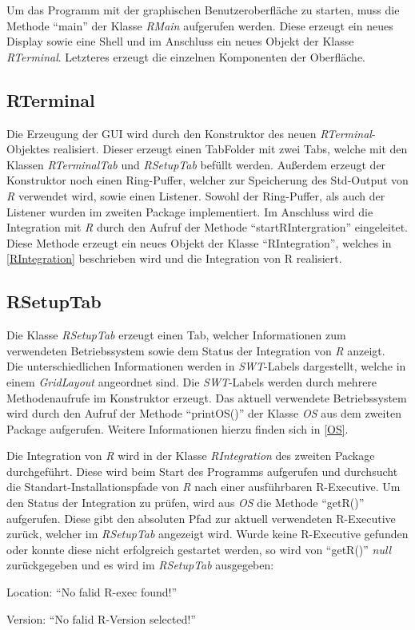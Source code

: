 \documentclass[a4paper, 12pt]{report} %
\begin{document}
Um das Programm mit der graphischen Benutzeroberfläche zu starten, muss die Methode "`main"' der Klasse \textit{RMain} aufgerufen werden. Diese erzeugt ein neues Display sowie eine Shell und im Anschluss ein neues Objekt der Klasse \textit{RTerminal}.
Letzteres erzeugt die einzelnen Komponenten der Oberfläche.

\subsection{RTerminal}

Die Erzeugung der GUI wird durch den Konstruktor des neuen \textit{RTerminal}-Objektes realisiert. Dieser erzeugt einen TabFolder mit zwei Tabs, welche mit den Klassen \textit{RTerminalTab} und \textit{RSetupTab} befüllt werden.
Außerdem erzeugt der Konstruktor noch einen Ring-Puffer, welcher zur Speicherung des Std-Output von \textit{R} verwendet wird, sowie einen Listener. Sowohl der Ring-Puffer, als auch der Listener wurden im zweiten Package implementiert.
Im Anschluss wird die Integration mit \textit{R} durch den Aufruf der Methode "`startRIntergration"' eingeleitet.\\

Diese Methode erzeugt ein neues Objekt der Klasse "`RIntegration"', welches in \ref{RIntegration} beschrieben wird und die Integration von R realisiert.

\subsection{RSetupTab}

Die Klasse \textit{RSetupTab} erzeugt einen Tab, welcher Informationen zum verwendeten Betriebssystem sowie dem Status der Integration von \textit{R} anzeigt.\\

Die unterschiedlichen Informationen werden in \textit{SWT}-Labels dargestellt, welche in einem \textit{GridLayout} angeordnet sind.
Die \textit{SWT}-Labels werden durch mehrere Methodenaufrufe im Konstruktor erzeugt.
Das aktuell verwendete Betriebssystem wird durch den Aufruf der Methode "`printOS()"' der Klasse \textit{OS} aus dem zweiten Package aufgerufen. Weitere Informationen hierzu finden sich in \ref{OS}.

Die Integration von \textit{R} wird in der Klasse \textit{RIntegration} des zweiten Package durchgeführt. Diese wird beim Start des Programms aufgerufen und durchsucht die Standart-Installationspfade von \textit{R} nach einer ausführbaren R-Executive.
 Um den Status der Integration zu prüfen, wird aus \textit{OS} die Methode "`getR()"' aufgerufen. Diese gibt den absoluten Pfad zur aktuell verwendeten R-Executive zurück, welcher im \textit{RSetupTab} angezeigt wird.
Wurde keine R-Executive gefunden oder konnte diese nicht erfolgreich gestartet werden, so wird von "`getR()"' \textit{null} zurückgegeben und es wird im \textit{RSetupTab} ausgegeben:  
\begin{center}
Location: "`No falid R-exec found!"'

Version: "`No falid R-Version selected!"'
\end{center}
\end{document}
